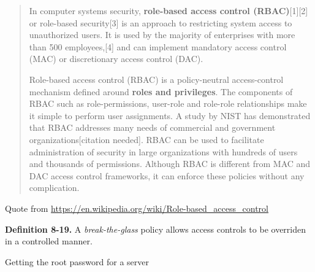 \documentclass[Screen16to9,17pt]{foils}
\begin{document}
\begin{list1}
\item
\item
\item
\item
\item
\end{list1}






\begin{quote}
In computer systems security, {\bf role-based access control (RBAC)}[1][2] or role-based security[3] is an approach to restricting system access to unauthorized users. It is used by the majority of enterprises with more than 500 employees,[4] and can implement mandatory access control (MAC) or discretionary access control (DAC).

Role-based access control (RBAC) is a policy-neutral access-control mechanism defined around {\bf roles and privileges}. The components of RBAC such as role-permissions, user-role and role-role relationships make it simple to perform user assignments. A study by NIST has demonstrated that RBAC addresses many needs of commercial and government organizations[citation needed]. RBAC can be used to facilitate administration of security in large organizations with hundreds of users and thousands of permissions. Although RBAC is different from MAC and DAC access control frameworks, it can enforce these policies without any complication.
\end{quote}
Quote from \url{https://en.wikipedia.org/wiki/Role-based_access_control}


\begin{list1}
\item
\item
\item
\item
\item
\end{list1}


\begin{list1}
\item {\bf Definition 8-19.} A \emph{break-the-glass} policy allows access controls to be overriden in a controlled manner.
\item
\item
\item
\item Getting the root password for a server
\end{list1}
\end{document}
